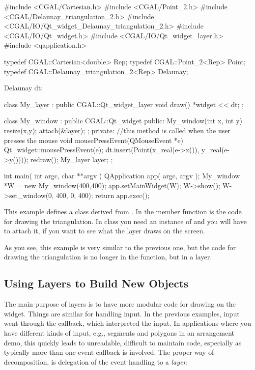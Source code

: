 \ccExample
\begin{ccExampleCode}
#include <CGAL/Cartesian.h>
#include <CGAL/Point_2.h>
#include <CGAL/Delaunay_triangulation_2.h>
#include <CGAL/IO/Qt_widget_Delaunay_triangulation_2.h>
#include <CGAL/IO/Qt_widget.h>
#include <CGAL/IO/Qt_widget_layer.h>
#include <qapplication.h>

typedef CGAL::Cartesian<double>             Rep;
typedef CGAL::Point_2<Rep>                  Point;
typedef CGAL::Delaunay_triangulation_2<Rep> Delaunay;

Delaunay dt;

class My_layer : public CGAL::Qt_widget_layer{
  void draw(){
    *widget << dt;
  }
};

class My_window : public CGAL::Qt_widget {
public:
  My_window(int x, int y)
  {
    resize(x,y);
    attach(&layer);
  };
private:
  //this method is called when the user presses the mouse
  void mousePressEvent(QMouseEvent *e)
  {
    Qt_widget::mousePressEvent(e);
    dt.insert(Point(x_real(e->x()), y_real(e->y())));
    redraw();
  }
  My_layer layer;
};

int main( int argc, char **argv )
{
    QApplication app( argc, argv );
    My_window *W = new My_window(400,400);
    app.setMainWidget(W);
    W->show();
    W->set_window(0, 400, 0, 400);
    return app.exec();
}
\end{ccExampleCode}

This example defines a class derived from
. In the member function 
is the code for drawing the triangulation. In 
class you need an instance of  and you will 
have to attach it, if you want to see what the layer draws on the
screen.

As you see, this example is very similar to the previous one, but
the code for drawing the triangulation is no longer in the
 function, but in a layer.



\subsection{Using Layers to Build New Objects }
\label{Qt_widget_tools}

The main purpose of layers is to have more modular code for drawing on
the widget. Things are similar for handling input. In the previous
examples, input went through the 
callback, which interpreted the input. In applications where you have
different kinds of input, e.g., segments and polygons in an
arrangement demo, this quickly leads to unreadable, difficult to maintain
code,  especially as typically more than one event callback is
involved. The proper way of decomposition, is delegation
of the event handling to a {\em layer}. 


